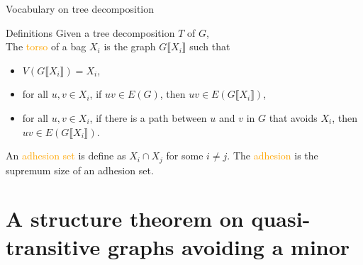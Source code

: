 \documentclass[11pt,dvipsnames,presentation,aspectratio=169]{beamer}
\newcommand{\myorange}{Orange}
\newcommand{\define}[1]{\textcolor{\myorange}{#1}}
\begin{document}
\begin{frame}{Vocabulary on tree decomposition}
  \begin{exampleblock}{Definitions}
    Given a tree decomposition $T$ of $G$,\\
    The \define{torso} of a bag $X_i$ is the graph
    $G\llbracket X_i \rrbracket$ such that
    \begin{itemize}
    \item $V(G\llbracket X_i \rrbracket) = X_i$,
    \item for all $u,v \in X_i$, if $uv \in E(G)$, then $uv\in E(G\llbracket X_i \rrbracket)$,
    \item for all $u,v \in X_i$, if there is a path between $u$ and $v$ in $G$
      that avoids $X_i$, then $uv \in E(G\llbracket X_i \rrbracket)$.
    \end{itemize}

    An \define{adhesion set} is define as $X_i \cap X_j$ for some $i\neq j$. The
    \define{adhesion} is the supremum size of an adhesion set. 
  \end{exampleblock}

\end{frame}

\section*{A structure theorem on quasi-transitive graphs avoiding a minor}
\end{document}
